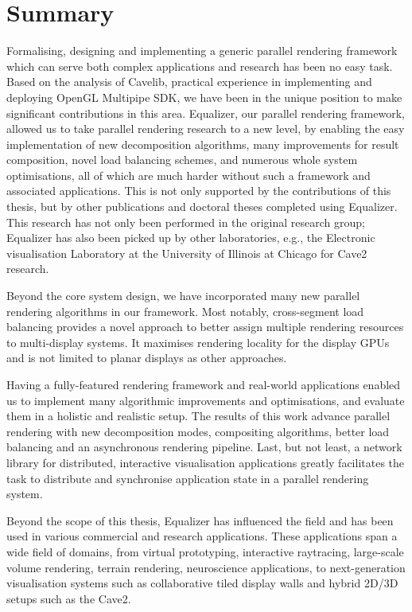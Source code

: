 \section{Summary}

Formalising, designing and implementing a generic parallel rendering framework
which can serve both complex applications and research has been no easy task.
Based on the analysis of Cavelib, practical experience in implementing and
deploying OpenGL Multipipe SDK, we have been in the unique position to make
significant contributions in this area. Equalizer, our parallel rendering
framework, allowed us to take parallel rendering research to a new level, by
enabling the easy implementation of new decomposition algorithms, many
improvements for result composition, novel load balancing schemes, and numerous
whole system optimisations, all of which are much harder without such a
framework and associated applications. This is not only supported by the
contributions of this thesis, but by other publications and doctoral theses
completed using Equalizer. This research has not only been performed in the
original research group; Equalizer has also been picked up by other
laboratories, e.g., the Electronic visualisation Laboratory at the University
of Illinois at Chicago for Cave2 research.

Beyond the core system design, we have incorporated many new parallel rendering
algorithms in our framework. Most notably, cross-segment load balancing
provides a novel approach to better assign multiple rendering resources to
multi-display systems. It maximises rendering locality for the display GPUs and
is not limited to planar displays as other approaches.

Having a fully-featured rendering framework and real-world applications enabled
us to implement many algorithmic improvements and optimisations, and evaluate
them in a holistic and realistic setup. The results of this work advance
parallel rendering with new decomposition modes, compositing algorithms, better
load balancing and an asynchronous rendering pipeline. Last, but not least, a
network library for distributed, interactive visualisation applications greatly
facilitates the task to distribute and synchronise application state in a
parallel rendering system.

Beyond the scope of this thesis, Equalizer has influenced the field and has
been used in various commercial and research applications. These applications
span a wide field of domains, from virtual prototyping, interactive raytracing,
large-scale volume rendering, terrain rendering, neuroscience applications, to
next-generation visualisation systems such as collaborative tiled display walls
and hybrid 2D/3D setups such as the Cave2.

